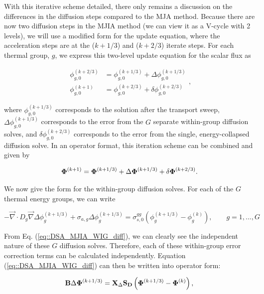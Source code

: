 With this iterative scheme detailed, there only remains a discussion on the differences in the diffusion steps compared to the MJA method. Because there are now two diffusion steps in the MJIA method (we can view it as a V-cycle with 2 levels), we will use a modified form for the update equation, where the acceleration steps are at the ($k+1/3$) and ($k+2/3$) iterate steps. For each thermal group, $g$, we express this two-level update equation for the scalar flux as

\begin{equation}
\label{eq::DSA_MJIA_update}
\begin{aligned}
\phi_{g,0}^{(k+2/3)} &=  \phi_{g,0}^{(k+1/3)}  + \Delta \phi_{g,0}^{(k+1/3)} \\
\phi_{g,0}^{(k+1)} &=  \phi_{g,0}^{(k+2/3)}  + \delta \phi_{g,0}^{(k+2/3)}
\end{aligned} ,
\end{equation}

\noindent where $\phi_{g,0}^{(k+1/3)}$ corresponds to the solution after the transport sweep, $ \Delta \phi_{g,0}^{(k+1/3)}$ corresponds to the error from the $G$ separate within-group diffusion solves, and $\delta \phi_{g,0}^{(k+2/3)}$ corresponds to the error from the single, energy-collapsed diffusion solve. In an operator format, this iteration scheme can be combined and given by

\begin{equation}
\label{eq::DSA_MJIA_update_op}
{\bf \Phi}^{(k+1)} = {\bf \Phi}^{(k+1/3)} + \Delta {\bf \Phi}^{(k+1/3)} + \delta {\bf \Phi}^{(k+2/3)}.
\end{equation}

\noindent We now give the form for the within-group diffusion solves. For each of the $G$ thermal energy groups, we can write 

\begin{equation}
\label{eq::DSA_MJIA_WIG_diff}
- \vec{\nabla} \cdot D_g \vec{\nabla} \Delta \phi_g^{(k+1/3)} + \sigma_{a,g} \Delta \phi_g^{(k+1/3)} = \sigma_{s,0}^{gg} \left(  \phi_g^{(k+1/3)} - \phi_g^{(k)} \right) , \qquad g=1,...,G 
\end{equation}

\noindent From Eq. (\ref{eq::DSA_MJIA_WIG_diff}), we can clearly see the independent nature of these $G$ diffusion solves. Therefore, each of these within-group error correction terms can be calculated independently. Equation (\ref{eq::DSA_MJIA_WIG_diff}) can then be written into operator form:

\begin{equation}
\label{eq::DSA_MJIA_WIG_diff_op}
{\bf B} \Delta {\bf \Phi}^{(k+1/3)} = {\bf X}_{\Delta} {\bf S_D} \left(  {\bf \Phi}^{(k+1/3)} - {\bf \Phi}^{(k)} \right) , 
\end{equation}

